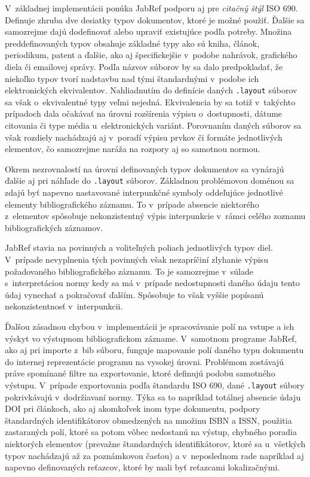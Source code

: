 \documentclass{fithesis3}
\begin{document}
	V~základnej implementácii ponúka JabRef podporu aj pre \textit{citačný štýl} ISO 690. Definuje zhruba dve desiatky typov dokumentov, ktoré je možné použiť. Ďalšie sa samozrejme dajú dodefinovať alebo upraviť existujúce podľa potreby. Množina preddefinovaných typov obsahuje základné typy ako sú kniha, článok, periodikum, patent a ďalšie, ako aj špecifickejšie v~podobe nahrávok, grafického diela či emailovej správy. Podľa názvov súborov by sa dalo predpokladať, že niekoľko typov tvorí nadstavbu nad tými štandardnými v~podobe ich elektronických ekvivalentov. Nahliadnutím do definície daných \texttt{.layout} súborov sa však o~ekvivalentné typy veľmi nejedná. Ekvivalencia by sa totiž v~takýchto prípadoch dala očakávať na úrovni rozšírenia výpisu o~dostupnosti, dátume citovania či type média u~elektronických variánt. Porovnaním daných súborov sa však rozdiely nachádzajú aj v~poradí výpisu prvkov či formáte jednotlivých elementov, čo samozrejme naráža na rozpory aj so samotnou normou.
	
	Okrem nezrovnalostí na úrovni definovaných typov dokumentov sa vynárajú ďalšie aj pri náhľade do \texttt{.layout} súborov. Základnou problémovou doménou sa zdajú byť napevno nastavované interpunkčné symboly oddeľujúce jednotlivé elementy bibliografického záznamu. To v~prípade absencie niektorého z~elementov spôsobuje nekonzistentný výpis interpunkcie v~rámci celého zoznamu bibliografických záznamov.
	
	JabRef stavia na povinných a voliteľných poliach jednotlivých typov diel. V~prípade nevyplnenia tých povinných však nezapríčiní zlyhanie výpisu požadovaného bibliografického záznamu. To je samozrejme v~súlade s~interpretáciou normy \cite{Biernatova2011} kedy sa má v~prípade nedostupnosti daného údaju tento údaj vynechať a pokračovať ďalším. Spôsobuje to však vyššie popísanú nekonzistentnosť v~interpunkcii.
	
	Ďalšou zásadnou chybou v~implementácii je spracovávanie polí na vstupe a ich výskyt vo výstupnom bibliografickom zázname. V~samotnom programe JabRef, ako aj pri importe z~bib súboru, funguje mapovanie polí daného typu dokumentu do internej reprezentácie programu na vysokej úrovni. Problémom zostávajú práve spomínané filtre na exportovanie, ktoré definujú podobu samotného výstupu. V~prípade exportovania podľa štandardu ISO 690, dané \texttt{.layout} súbory pokrivkávajú v~dodržiavaní normy. Týka sa to napríklad totálnej absencie údaju DOI pri článkoch, ako aj akomkoľvek inom type dokumentu, podpory štandardných identifikátorov obmedzených na množinu ISBN a ISSN, použitia zastaraných polí, ktoré sa potom vôbec nedostanú na výstup, chybného poradia niektorých elementov (prevažne štandardných identifikátorov, ktoré sa u~všetkých typov nachádzajú až za poznámkovou časťou) a v~neposlednom rade napríklad aj napevno definovaných reťazcov, ktoré by mali byť reťazcami lokalizačnými.
	
\end{document}
